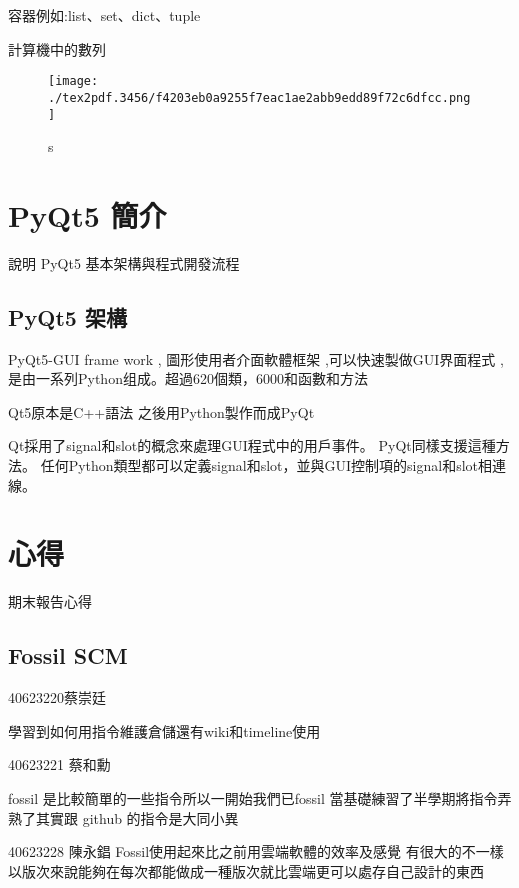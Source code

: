 \documentclass[12pt,,]{report}
\begin{document}
容器例如:list、set、dict、tuple

計算機中的數列

\begin{figure}
\centering
\texttt{[image: ./tex2pdf.3456/f4203eb0a9255f7eac1ae2abb9edd89f72c6dfcc.png]}
\caption{s\label{fig:數列}}
\end{figure}

\hypertarget{pyqt5-ux7c21ux4ecb}{%
\chapter{PyQt5 簡介}\label{pyqt5-ux7c21ux4ecb}}

說明 PyQt5 基本架構與程式開發流程

\hypertarget{pyqt5-ux67b6ux69cb}{%
\section{PyQt5 架構}\label{pyqt5-ux67b6ux69cb}}

PyQt5-GUI frame work , 圖形使用者介面軟體框架 ,可以快速製做GUI界面程式 ,
是由一系列Python组成。超過620個類，6000和函數和方法

Qt5原本是C++語法 之後用Python製作而成PyQt

Qt採用了signal和slot的概念來處理GUI程式中的用戶事件。
PyQt同樣支援這種方法。
任何Python類型都可以定義signal和slot，並與GUI控制項的signal和slot相連線。

\hypertarget{ux5fc3ux5f97}{%
\chapter{心得}\label{ux5fc3ux5f97}}

期末報告心得

\hypertarget{fossil-scm}{%
\section{Fossil SCM}\label{fossil-scm}}

40623220蔡崇廷

學習到如何用指令維護倉儲還有wiki和timeline使用

40623221 蔡和勳

fossil 是比較簡單的一些指令所以一開始我們已fossil
當基礎練習了半學期將指令弄熟了其實跟 github 的指令是大同小異

40623228 陳永錩 Fossil使用起來比之前用雲端軟體的效率及感覺
有很大的不一樣以版次來說能夠在每次都能做成一種版次就比雲端更可以處存自己設計的東西
\end{document}
